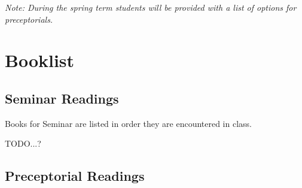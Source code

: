 \documentclass{article}
\begin{document}
\textit{Note: During the spring term students will be provided with a list of options for preceptorials.}


\clearpage
\section{Booklist}

\subsection{Seminar Readings}
Books for Seminar are listed in order they are encountered in class.

TODO...?
\subsection{Preceptorial Readings}
\fallPreceptOneReadingList
\fallPreceptTwoReadingList
\summerPreceptReadingList

\end{document}
